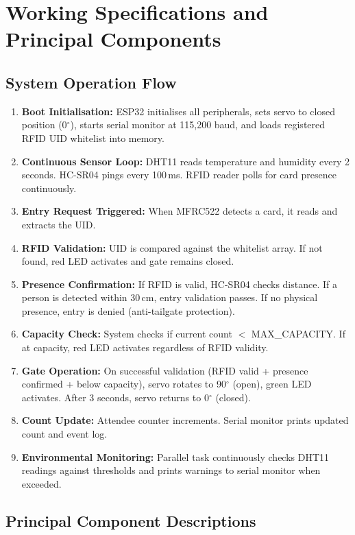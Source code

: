\documentclass[12pt,a4paper]{report}
\begin{document}
\section{Working Specifications and Principal Components}

\subsection*{System Operation Flow}

\begin{enumerate}[leftmargin=*]
    \item \textbf{Boot Initialisation:} ESP32 initialises all peripherals, sets servo to closed position (0$^\circ$), starts serial monitor at 115,200 baud, and loads registered RFID UID whitelist into memory.
    \item \textbf{Continuous Sensor Loop:} DHT11 reads temperature and humidity every 2 seconds. HC-SR04 pings every 100\,ms. RFID reader polls for card presence continuously.
    \item \textbf{Entry Request Triggered:} When MFRC522 detects a card, it reads and extracts the UID.
    \item \textbf{RFID Validation:} UID is compared against the whitelist array. If not found, red LED activates and gate remains closed.
    \item \textbf{Presence Confirmation:} If RFID is valid, HC-SR04 checks distance. If a person is detected within 30\,cm, entry validation passes. If no physical presence, entry is denied (anti-tailgate protection).
    \item \textbf{Capacity Check:} System checks if current count $<$ MAX\_CAPACITY. If at capacity, red LED activates regardless of RFID validity.
    \item \textbf{Gate Operation:} On successful validation (RFID valid + presence confirmed + below capacity), servo rotates to 90$^\circ$ (open), green LED activates. After 3 seconds, servo returns to 0$^\circ$ (closed).
    \item \textbf{Count Update:} Attendee counter increments. Serial monitor prints updated count and event log.
    \item \textbf{Environmental Monitoring:} Parallel task continuously checks DHT11 readings against thresholds and prints warnings to serial monitor when exceeded.
\end{enumerate}

\subsection*{Principal Component Descriptions}
\end{document}
